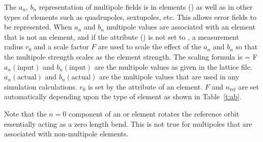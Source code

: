 The $a_n$, $b_n$ representation of multipole fields is in
 elements () as well as in other types
of elements such as quadrupoles, sextupoles, etc. This allows error
fields to be represented.  When $a_n$ and $b_n$ multipole values are
associated with an element that is not an  element,
and if the  attribute () is not
set to , a measurement radius $r_0$ and a scale factor $F$
are used to scale the effect of the $a_n$ and $b_n$ so that the
multipole strength scales as the element strength. The scaling formula
is
\Begineq
   =
  \cdot F \cdot {} 
  \label{ababf}
\Endeq
$a_n(\text{input})$ and $b_n(\text{input})$ are the multipole values as given in the
lattice file. $a_n(\text{actual})$ and $b_n(\text{actual})$ are the multipole values
that are used in any simulation calculations. $r_0$ is set by the
 attribute of an element. $F$ and $n_\text{ref}$ are set
automatically depending upon the type of element as shown in
Table~\ref{t:ab}.

Note that the $n = 0$ component of an  or 
element rotates the reference orbit essentially acting as a zero length bend.
This is not true for multipoles that are associated with 
non-multipole elements.

